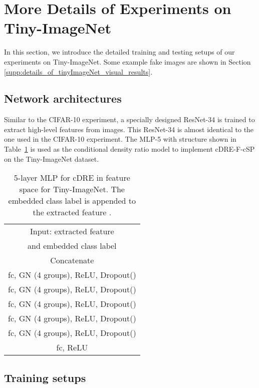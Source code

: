\documentclass[10pt, twocolumn]{article}
\theoremstyle{definition}
\begin{document}
\section{More Details of Experiments on Tiny-ImageNet}\label{supp:details_of_tinyImageNet}

In this section, we introduce the detailed training and testing setups of our experiments on Tiny-ImageNet. Some example fake images are shown in Section \ref{supp:details_of_tinyImageNet_visual_results}.

\subsection{Network architectures} \label{supp:net_arch_of_tinyImageNet_exp}

Similar to the CIFAR-10 experiment, a specially designed ResNet-34 is trained to extract high-level features from images. This ResNet-34 is almost identical to the one used in the CIFAR-10 experiment. The MLP-5 with structure shown in Table~\ref{tab:tinyimagenet_cMLP5} is used as the conditional density ratio model to implement cDRE-F-cSP on the Tiny-ImageNet dataset.    

\begin{table}[!htbp]
	\centering
	\caption{5-layer MLP for cDRE in feature space for Tiny-ImageNet. The embedded class label is appended to the extracted feature .}
	\begin{tabular}{c}
		\toprule
		Input: extracted feature  \\
		and embedded class label  \\
		\hline
		Concatenate \\
		\hline
		fc, GN (4 groups), ReLU, Dropout() \\\hline
		fc, GN (4 groups), ReLU, Dropout() \\\hline
		fc, GN (4 groups), ReLU, Dropout() \\\hline
		fc, GN (4 groups), ReLU, Dropout() \\\hline
		fc, GN (4 groups), ReLU, Dropout() \\\hline
		fc, ReLU \\
		\bottomrule
	\end{tabular}\label{tab:tinyimagenet_cMLP5}\end{table}



\subsection{Training setups} \label{supp:train_setup_of_tinyImageNet_exp}
\end{document}

